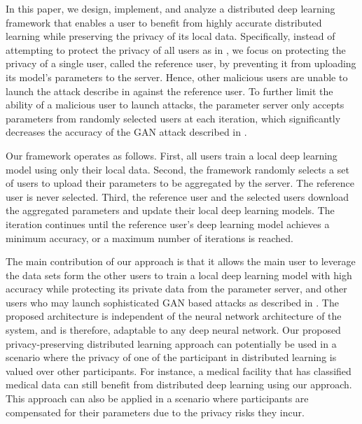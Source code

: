 \documentclass[conference]{IEEEtran}
\begin{document}
In this paper, we design, implement, and analyze a distributed deep learning framework that enables a user 
to benefit from highly accurate distributed learning while preserving the privacy of its local data. 
Specifically,  instead of attempting to protect the privacy of all users as in \cite{shokri2015privacy}, we focus on protecting the
privacy of a single user, called the reference user, by preventing it from uploading its model's parameters to the server. Hence,
other malicious users are unable to launch the attack describe in \cite{hitaj2017deep} against the reference user. To further limit the
ability of a malicious user to launch attacks, the parameter server only accepts parameters from randomly
selected users at each iteration, which significantly decreases the accuracy of the GAN attack described in \cite{hitaj2017deep}. 

Our framework operates as follows. First, all users train a local deep learning model using only their local data.
Second, the framework randomly selects a set of users to upload their parameters to be aggregated by the server. The reference user is
never selected. Third, the reference user and the selected users download the aggregated parameters and update their local
deep learning models. The iteration continues until the reference user's deep learning model achieves a minimum
accuracy, or a maximum number of iterations is reached.

The main contribution of our approach is that it allows the main user to leverage the data sets form the other users to train a local
deep learning model with high accuracy while protecting its private data from the parameter server, and other users who
may launch sophisticated GAN based attacks as described in \cite{hitaj2017deep}. The proposed architecture is independent of the
neural network architecture of the system, and is therefore, adaptable to any deep neural network. Our proposed privacy-preserving
distributed learning approach can potentially be used in a scenario where the privacy of one of the participant in distributed learning is valued over other participants. For instance, a medical facility that has classified medical data can still benefit from distributed deep learning using our approach.
This approach can also be applied in a scenario where participants are compensated for their parameters due to the privacy risks they incur. 


\end{document}
